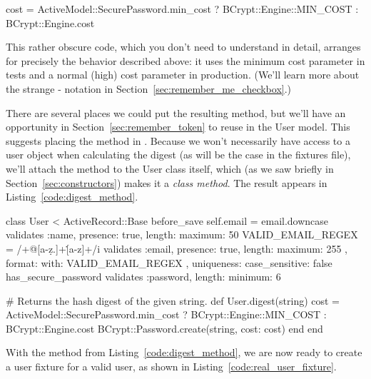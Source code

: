 \begin{code}
cost = ActiveModel::SecurePassword.min_cost ? BCrypt::Engine::MIN_COST :
                                              BCrypt::Engine.cost
\end{code}

\noindent This rather obscure code, which you don't need to understand in detail, arranges for precisely the behavior described above: it uses the minimum cost parameter in tests and a normal (high) cost parameter in production. (We'll learn more about the strange -\kode{:} notation in Section~\ref{sec:remember_me_checkbox}.)

There are several places we could put the resulting  method, but we'll have an opportunity in Section~\ref{sec:remember_token} to reuse  in the User model. This suggests placing the method in . Because we won't necessarily have access to a user object when calculating the digest (as will be the case in the fixtures file), we'll attach the  method to the User class itself, which (as we saw briefly in Section~\ref{sec:constructors}) makes it a \emph{class method}. The result appears in Listing~\ref{code:digest_method}.

\begin{codelisting}
\label{code:digest_method}
\begin{code}
class User < ActiveRecord::Base
  before_save { self.email = email.downcase }
  validates :name,  presence: true, length: { maximum: 50 }
  VALID_EMAIL_REGEX = /\A[\w+\-.]+@[a-z\d\-.]+\.[a-z]+\z/i
  validates :email, presence: true, length: { maximum: 255 },
                    format: { with: VALID_EMAIL_REGEX },
                    uniqueness: { case_sensitive: false }
  has_secure_password
  validates :password, length: { minimum: 6 }

  # Returns the hash digest of the given string.
  def User.digest(string)
    cost = ActiveModel::SecurePassword.min_cost ? BCrypt::Engine::MIN_COST :
                                                  BCrypt::Engine.cost
    BCrypt::Password.create(string, cost: cost)
  end
end
\end{code}
\end{codelisting}

With the  method from Listing~\ref{code:digest_method}, we are now ready to create a user fixture for a valid user, as shown in Listing~\ref{code:real_user_fixture}.


